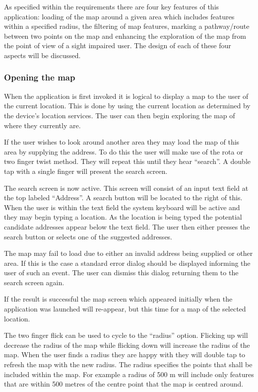 \documentclass[11pt,twoside,a4paper]{article}
\begin{document}
As specified within the requirements there are four key features of this
application: loading of the map around a given area which includes
features within a specified radius, the filtering of map features,
marking a pathway/route between two points on the map and enhancing the
exploration of the map from the point of view of a sight impaired
user. The design of each of these four aspects will be discussed.

\subsubsection{Opening the map}

When the application is first invoked it is logical to display a map to
the user of the current location. This is done by using the current
location as determined by the device's location services. The user can
then begin exploring the map of where they currently are.

If the user wishes to look around another area they may load the map of
this area by supplying the address. To do this the user will make use of
the rota or two finger twist method. They will repeat this until they
hear ``search''. A double tap with a single finger will present the
search screen.

The search screen is now active. This screen will consist of an input
text field at the top labeled ``Address''. A search button will be
located to the right of this. When the user is within the text field the
system keyboard will be active and they may begin typing a location. As
the location is being typed the potential candidate addresses appear
below the text field. The user then either presses the search button or
selects one of the suggested addresses.

The map may fail to load due to either an invalid address being supplied
or other area. If this is the case a standard error dialog should be
displayed informing the user of such an event. The user can dismiss this
dialog returning them to the search screen again.

If the result is successful the map screen which appeared initially when
the application was launched will re-appear, but this time for a map of
the selected location.

The two finger flick can be used to cycle to the ``radius''
option. Flicking up will decrease the radius of the map while flicking
down will increase the radius of the map. When the user finds a radius
they are happy with they will double tap to refresh the map with the new
radius. The radius specifies the points that shall be included within
the map. For example a radius of 500 m will include only features that
are within 500 metres of the centre point that the map is centred
around.
\end{document}
